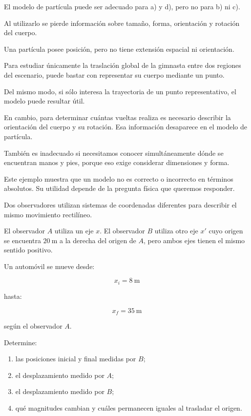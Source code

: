\begin{respuesta}
El modelo de partícula puede ser adecuado para a) y d), pero no para b) ni c).

Al utilizarlo se pierde información sobre tamaño, forma, orientación y rotación del cuerpo.
\end{respuesta}

\begin{explicacion}
Una partícula posee posición, pero no tiene extensión espacial ni orientación.

Para estudiar únicamente la traslación global de la gimnasta entre dos regiones del escenario, puede bastar con representar su cuerpo mediante un punto.

Del mismo modo, si sólo interesa la trayectoria de un punto representativo, el modelo puede resultar útil.

En cambio, para determinar cuántas vueltas realiza es necesario describir la orientación del cuerpo y su rotación. Esa información desaparece en el modelo de partícula.

También es inadecuado si necesitamos conocer simultáneamente dónde se encuentran manos y pies, porque eso exige considerar dimensiones y forma.

Este ejemplo muestra que un modelo no es correcto o incorrecto en términos absolutos. Su utilidad depende de la pregunta física que queremos responder.
\end{explicacion}


\begin{ejercicio}
Dos observadores utilizan sistemas de coordenadas diferentes para describir el mismo movimiento rectilíneo.

El observador \(A\) utiliza un eje \(x\). El observador \(B\) utiliza otro eje \(x'\) cuyo origen se encuentra \(\SI{20}{\meter}\) a la derecha del origen de \(A\), pero ambos ejes tienen el mismo sentido positivo.

Un automóvil se mueve desde:

\[ x_i=\SI{8}{\meter} \]

hasta:

\[ x_f=\SI{35}{\meter} \]

según el observador \(A\).

Determine:

\begin{enumerate}[label=\alph*)]
    \item las posiciones inicial y final medidas por \(B\);
    \item el desplazamiento medido por \(A\);
    \item el desplazamiento medido por \(B\);
    \item qué magnitudes cambian y cuáles permanecen iguales al trasladar el origen.
\end{enumerate}
\end{ejercicio}


